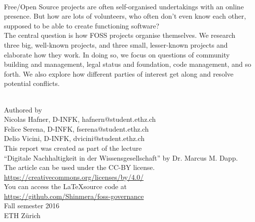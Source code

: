 \thispagestyle{empty}
\begin{center}
  {\bfseries\Huge\doctitle} \\
  \vspace{2cm}
  \parbox{0.7\linewidth}{\small
    Free/Open Source projects are often self-organised undertakings with an online presence. But how are lots of volunteers, who often don't even know each other, supposed to be able to create functioning software? \\
    
    The central question is how FOSS projects organise themselves. We research three big, well-known projects, and three small, lesser-known projects and elaborate how they work. In doing so, we focus on questions of community building and management, legal status and foundation, code management, and so forth. We also explore how different parties of interest get along and resolve potential conflicts.} \\
  \vspace{6cm}
  Authored by \\
  Nicolas Hafner, D-INFK, hafnern@student.ethz.ch \\
  Felice Serena, D-INFK,  fserena@student.ethz.ch \\
  Delio Vicini, D-INFK, dvicini@student.ethz.ch \\
  \vspace{1cm}
  This report was created as part of the lecture \\
  ``Digitale Nachhaltigkeit in der Wissensgesellschaft'' by Dr. Marcus M. Dapp. \\
  \vspace{1cm}
  The article can be used under the CC-BY license. \\
  \url{https://creativecommons.org/licenses/by/4.0/} \\
  You can access the \LaTeX\space source code at \\
  \url{https://github.com/Shinmera/foss-governance} \\
  \vspace{2cm}
  Fall semester 2016 \\
  ETH Zürich
\end{center}

\newpage

